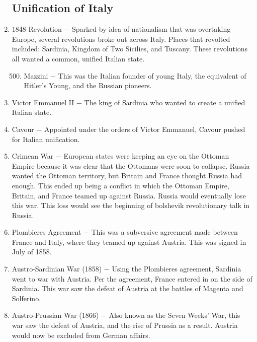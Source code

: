 \documentclass[12pt]{article}
\begin{document}
\begin{enumerate}
\subsection{Unification of Italy}

\item 1848 Revolution $-$ Sparked by idea of nationalism that was overtaking Europe, several revolutions broke out across Italy. Places that revolted included: Sardinia, Kingdom of Two Sicilies, and Tuscany. These revolutions all wanted a common, unified Italian state.

\begin{enumerate}[label=\arabic{*}.]
\setcounter{enumii}{499}

\item Mazzini $-$ This was the Italian founder of young Italy, the equivalent of Hitler's Young, and the Russian pioneers.

\end{enumerate}
\setcounter{enumi}{500}

\item Victor Emmanuel II $-$ The king of Sardinia who wanted to create a unified Italian state. 

\item Cavour $-$ Appointed under the orders of Victor Emmanuel, Cavour pushed for Italian unification.

\item Crimean War $-$ European states were keeping an eye on the Ottoman Empire because it was clear that the Ottomans were soon to collapse. Russia wanted the Ottoman territory, but Britain and France thought Russia had enough. This ended up being a conflict in which the Ottoman Empire, Britain, and France teamed up against Russia. Russia would eventually lose this war. This loss would see the beginning of bolshevik revolutionary talk in Russia.

\item Plombieres Agreement $-$ This was a subversive agreement made between France and Italy, where they teamed up against Austria. This was signed in July of 1858. 

\item Austro-Sardinian War (1858) $-$ Using the Plombieres agreement, Sardinia went to war with Austria. Per the agreement, France entered in on the side of Sardinia. This war saw the defeat of Austria at the battles of Magenta and Solferino.

\item Austro-Prussian War (1866) $-$ Also known as the Seven Weeks' War, this war saw the defeat of Austria, and the rise of Prussia as a result. Austria would now be excluded from German affairs.


\end{enumerate}
\end{document}
